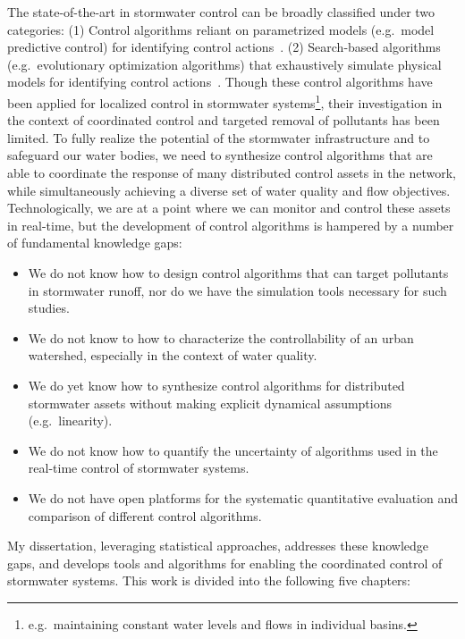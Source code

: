 The state-of-the-art in stormwater control  can be broadly classified under two categories: (1) Control algorithms reliant on parametrized models (e.g.\ model predictive control) for identifying control actions~\cite{Wong_Kerkez_2018, Ocampo-Martinez_2015,joseph2014hybrid, Sun_Lorenz_2020, lund2020cso}. (2) Search-based algorithms (e.g.\ evolutionary optimization algorithms) that exhaustively simulate physical models for identifying control actions~\cite{shishegar2018optimization,sadler2019, lund2018, Rjeily_2018, Meneses_2018, vezzaro2014}.
Though these control algorithms have been applied for localized control in stormwater systems\footnote{e.g.\ maintaining constant water levels and flows in individual basins.}, their investigation in the context of coordinated control and targeted removal of pollutants has been limited.
To fully realize the potential of the stormwater infrastructure and to safeguard our water bodies, we need to synthesize control algorithms that are able to coordinate the response of many distributed control assets in the network, while simultaneously achieving a diverse set of water quality and flow objectives. 
Technologically, we are at a point where we can monitor and control these assets in real-time, but the development of control algorithms is hampered by a number of fundamental knowledge gaps:
\begin{itemize}
	\item We do not know how to design control algorithms that can target pollutants in stormwater runoff, nor do we have the simulation tools necessary for such studies.
	\item We do not know to how to characterize the controllability of an urban watershed, especially in the context of water quality.
	\item We do yet know how to synthesize control algorithms for distributed stormwater assets without making explicit dynamical assumptions (e.g.\ linearity).
	\item We do not know how to quantify the uncertainty of algorithms used in the real-time control of stormwater systems.
	\item We do not have open platforms for the systematic quantitative evaluation and comparison of different control algorithms.
\end{itemize}

My dissertation, leveraging statistical approaches, addresses these knowledge gaps, and develops tools and algorithms for enabling the coordinated control of stormwater systems. This work is divided into the following five chapters:

